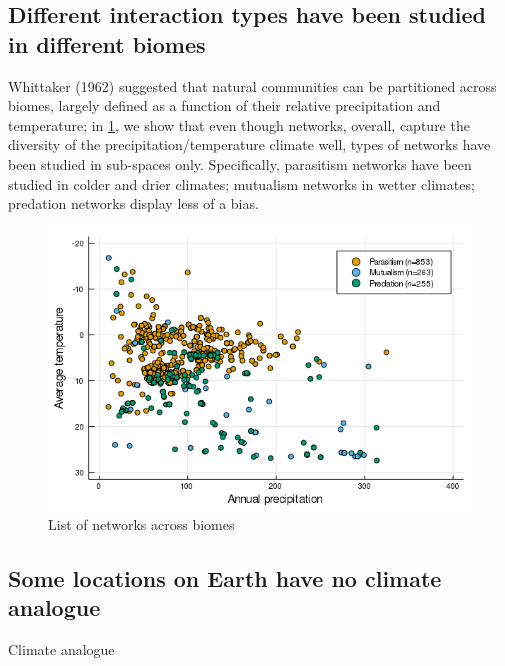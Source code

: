 \hypertarget{different-interaction-types-have-been-studied-in-different-biomes}{%
\subsection{Different interaction types have been studied in different
biomes}\label{different-interaction-types-have-been-studied-in-different-biomes}}

Whittaker (1962) suggested that natural communities can be partitioned
across biomes, largely defined as a function of their relative
precipitation and temperature; in \cref{fig:biomes}, we
show that even though networks, overall, capture the diversity of the
precipitation/temperature climate well, types of networks have been
studied in sub-spaces only. Specifically, parasitism networks have been
studied in colder and drier climates; mutualism networks in wetter
climates; predation networks display less of a bias.

\begin{figure}
\centering
\includegraphics{figures/figure_02.png}
\caption{List of networks across biomes\label{fig:biomes}}
\end{figure}

\hypertarget{some-locations-on-earth-have-no-climate-analogue}{%
\subsection{Some locations on Earth have no climate
analogue}\label{some-locations-on-earth-have-no-climate-analogue}}

Climate analogue

